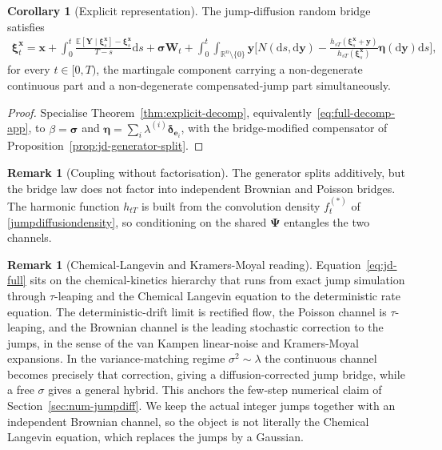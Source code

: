 \documentclass{article}
\def\R{\mathbb{R}}
\def\E{\mathbb{E}}
\def\dd{\mathrm{d}}
\def\xib{\boldsymbol{\xi}}
\theoremstyle{definition}
\newtheorem{corollary}[proposition]{Corollary}
\newtheorem{remark}[proposition]{Remark}
\begin{document}
\begin{corollary}[Explicit representation]
\label{cor:jd-explicit}
The jump-diffusion random bridge satisfies
\begin{align}
\label{eq:jd-full}
\xib^{\boldsymbol{x}}_t = \boldsymbol{x}
 + \int_0^t \frac{\E[\boldsymbol{Y}\mid\xib^{\boldsymbol{x}}_s]-\xib^{\boldsymbol{x}}_s}{T-s}\dd s
 + \boldsymbol{\sigma}\mathbf{W}_t
 + \int_0^t\!\!\int_{\R^n\setminus\{0\}}\boldsymbol{y}
   \Big[N(\dd s,\dd\boldsymbol{y})-\tfrac{h_{sT}(\xib^{\boldsymbol{x}}_s+\boldsymbol{y})}{h_{sT}(\xib^{\boldsymbol{x}}_s)}\boldsymbol{\eta}(\dd\boldsymbol{y})\dd s\Big],
\end{align}
for every $t\in[0,T)$, the martingale component carrying a non-degenerate continuous part and a
non-degenerate compensated-jump part simultaneously.
\end{corollary}
\begin{proof}
Specialise Theorem~\ref{thm:explicit-decomp}, equivalently~\eqref{eq:full-decomp-app}, to
$\beta=\boldsymbol{\sigma}$ and $\boldsymbol{\eta}=\sum_i\lambda^{(i)}\boldsymbol{\delta}_{\boldsymbol{e}_i}$,
with the bridge-modified compensator of Proposition~\ref{prop:jd-generator-split}.
\end{proof}

\begin{remark}[Coupling without factorisation]
The generator splits additively, but the bridge law does not factor into independent Brownian and
Poisson bridges. The harmonic function $h_{tT}$ is built from the convolution density $f^{(*)}_t$ of
\eqref{jumpdiffusiondensity}, so conditioning on the shared $\boldsymbol{\Psi}$ entangles the two
channels.
\end{remark}

\begin{remark}[Chemical-Langevin and Kramers-Moyal reading]
\label{rem:kramers-moyal}
Equation~\eqref{eq:jd-full} sits on the chemical-kinetics hierarchy that runs from exact jump
simulation through $\tau$-leaping and the Chemical Langevin equation to the deterministic rate
equation. The deterministic-drift limit is rectified flow, the Poisson channel is $\tau$-leaping, and
the Brownian channel is the leading stochastic correction to the jumps, in the sense of the van Kampen
linear-noise and Kramers-Moyal expansions. In the variance-matching regime $\sigma^2\sim\lambda$ the
continuous channel becomes precisely that correction, giving a diffusion-corrected jump bridge, while a
free $\sigma$ gives a general hybrid. This anchors the few-step numerical claim of
Section~\ref{sec:num-jumpdiff}. We keep the actual integer jumps together with an independent Brownian
channel, so the object is not literally the Chemical Langevin equation, which replaces the jumps by a
Gaussian.
\end{remark}
\end{document}
